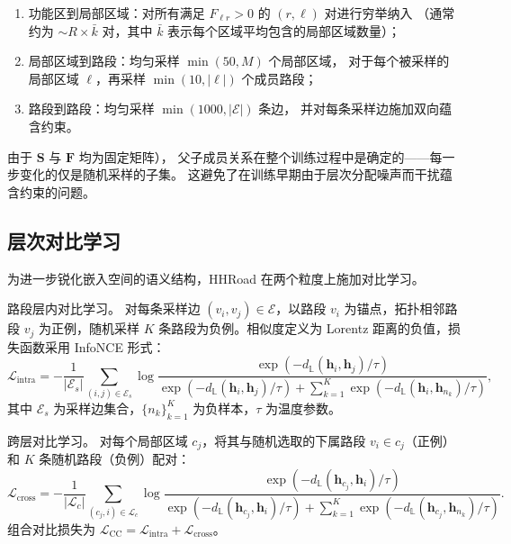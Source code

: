 \begin{enumerate}[label=(\arabic*)]
  \item 功能区到局部区域：对所有满足 $F_{\ell r} > 0$ 的 $(r, \ell)$ 对进行穷举纳入
    （通常约为 $\sim\!R {\times} \bar{k}$ 对，其中 $\bar{k}$ 表示每个区域平均包含的局部区域数量）；
  \item 局部区域到路段：均匀采样 $\min(50, M)$ 个局部区域，
    对于每个被采样的局部区域 $\ell$，再采样 $\min(10, |\ell|)$ 个成员路段；
  \item 路段到路段：均匀采样 $\min(1000, |\mathcal{E}|)$ 条边，
    并对每条采样边施加双向蕴含约束。
\end{enumerate}

由于 $\mathbf{S}$ 与 $\mathbf{F}$ 均为固定矩阵），
父子成员关系在整个训练过程中是确定的——每一步变化的仅是随机采样的子集。
这避免了在训练早期由于层次分配噪声而干扰蕴含约束的问题。

\subsection{层次对比学习}

为进一步锐化嵌入空间的语义结构，HHRoad 在两个粒度上施加对比学习。

路段层内对比学习。 对每条采样边 $(v_i, v_j) \in \mathcal{E}$，以路段 $v_i$ 为锚点，拓扑相邻路段 $v_j$ 为正例，随机采样 $K$ 条路段为负例。相似度定义为 Lorentz 距离的负值，损失函数采用 InfoNCE 形式：
\begin{equation}
    \mathcal{L}_{\text{intra}} = -\frac{1}{|\mathcal{E}_s|}
    \sum_{(i,j) \in \mathcal{E}_s}
    \log \frac{
      \exp\!\left(-d_{\mathbb{L}}(\mathbf{h}_i, \mathbf{h}_j) / \tau\right)
    }{
      \exp\!\left(-d_{\mathbb{L}}(\mathbf{h}_i, \mathbf{h}_j) / \tau\right)
      + \sum_{k=1}^{K} \exp\!\left(-d_{\mathbb{L}}(\mathbf{h}_i, \mathbf{h}_{n_k}) / \tau\right)
    },
    \label{eq:loss_seg_cl}
\end{equation}
其中 $\mathcal{E}_s$ 为采样边集合，$\{n_k\}_{k=1}^K$ 为负样本，$\tau$ 为温度参数。

跨层对比学习。 对每个局部区域 $c_j$，将其与随机选取的下属路段 $v_i \in c_j$（正例）和 $K$ 条随机路段（负例）配对：
\begin{equation}
    \mathcal{L}_{\text{cross}} = -\frac{1}{|\mathcal{L}_c|}
    \sum_{(c_j, i) \in \mathcal{L}_c}
    \log \frac{
      \exp\!\left(-d_{\mathbb{L}}(\mathbf{h}_{c_j}, \mathbf{h}_i) / \tau\right)
    }{
      \exp\!\left(-d_{\mathbb{L}}(\mathbf{h}_{c_j}, \mathbf{h}_i) / \tau\right)
      + \sum_{k=1}^{K} \exp\!\left(-d_{\mathbb{L}}(\mathbf{h}_{c_j}, \mathbf{h}_{n_k}) / \tau\right)
    }.
    \label{eq:loss_cross_cl}
\end{equation}
组合对比损失为 $\mathcal{L}_{\text{CC}} = \mathcal{L}_{\text{intra}} + \mathcal{L}_{\text{cross}}$。

